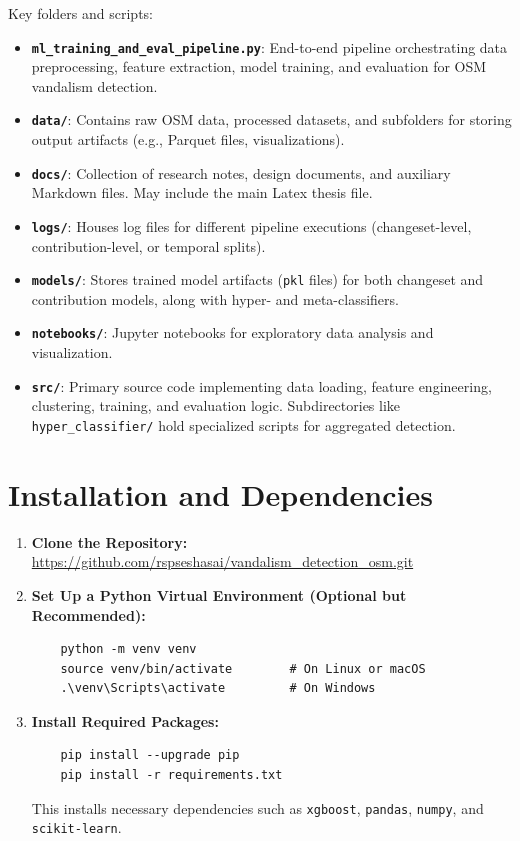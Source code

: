 \documentclass[
    13pt, %
    a4paper, %
    listof=totoc, %
    bibliography=totoc, %
    index=totoc, %
    headsepline
]{scrreprt}
\begin{document}
\noindent
Key folders and scripts:
\begin{itemize}
    \item \textbf{\texttt{ml\_training\_and\_eval\_pipeline.py}}: End-to-end pipeline orchestrating data preprocessing, feature extraction, model training, and evaluation for OSM vandalism detection.
    \item \textbf{\texttt{data/}}: Contains raw OSM data, processed datasets, and subfolders for storing output artifacts (e.g., Parquet files, visualizations).
    \item \textbf{\texttt{docs/}}: Collection of research notes, design documents, and auxiliary Markdown files. May include the main Latex thesis file.
    \item \textbf{\texttt{logs/}}: Houses log files for different pipeline executions (changeset-level, contribution-level, or temporal splits).
    \item \textbf{\texttt{models/}}: Stores trained model artifacts (\texttt{pkl} files) for both changeset and contribution models, along with hyper- and meta-classifiers.
    \item \textbf{\texttt{notebooks/}}: Jupyter notebooks for exploratory data analysis and visualization. 
    \item \textbf{\texttt{src/}}: Primary source code implementing data loading, feature engineering, clustering, training, and evaluation logic. Subdirectories like \texttt{hyper\_classifier/} hold specialized scripts for aggregated detection. 
\end{itemize}

\section{Installation and Dependencies}
\label{sec:installation}

\begin{enumerate}
    \item \textbf{Clone the Repository:}
    \newline \url{https://github.com/rspseshasai/vandalism_detection_osm.git}

    \item \textbf{Set Up a Python Virtual Environment (Optional but Recommended):}
    \begin{verbatim}
    python -m venv venv
    source venv/bin/activate        # On Linux or macOS
    .\venv\Scripts\activate         # On Windows
    \end{verbatim}

    \item \textbf{Install Required Packages:}
    \begin{verbatim}
    pip install --upgrade pip
    pip install -r requirements.txt
    \end{verbatim}
    This installs necessary dependencies such as \texttt{xgboost}, \texttt{pandas}, \texttt{numpy}, and \texttt{scikit-learn}.
\end{enumerate}
\end{document}
